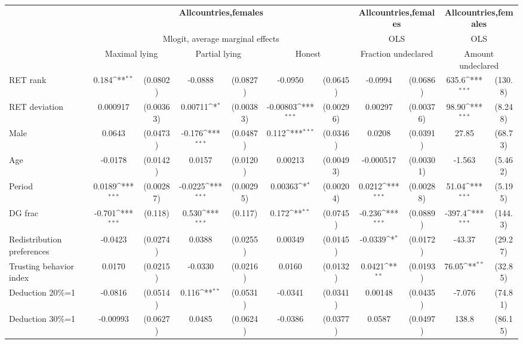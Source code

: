 \def\sym#1{\ifmmode^{#1}\else\(^{#1}\)\fi}
\begin{tabular}{l|cccccc|cc|cc}
\hline\hline
&\multicolumn{6}{c|}{\bf All\space{}countries,\space{}females}&\multicolumn{2}{c|}{\bf All\space{}countries,\space{}females}&\multicolumn{2}{c}{\bf All\space{}countries,\space{}females}\\ &\multicolumn{6}{c|}{Mlogit, average marginal effects }&\multicolumn{2}{c|}{OLS}&\multicolumn{2}{c}{OLS}\\
                &\multicolumn{2}{c}{Maximal lying}&\multicolumn{2}{c}{Partial lying}&\multicolumn{2}{c}{Honest}  &\multicolumn{2}{c}{Fraction undeclared}&\multicolumn{2}{c}{Amount undeclared}\\
\hline
RET rank        &    0.184\sym{**} & (0.0802)&  -0.0888         & (0.0827)&  -0.0950         & (0.0645)&  -0.0994         & (0.0686)&    635.6\sym{***}&  (130.8)\\
RET deviation   & 0.000917         &(0.00363)&  0.00711\sym{*}  &(0.00383)& -0.00803\sym{***}&(0.00296)&  0.00297         &(0.00376)&    98.90\sym{***}&  (8.248)\\
Male            &   0.0643         & (0.0473)&   -0.176\sym{***}& (0.0487)&    0.112\sym{***}& (0.0346)&   0.0208         & (0.0391)&    27.85         &  (68.73)\\
Age             &  -0.0178         & (0.0142)&   0.0157         & (0.0120)&  0.00213         &(0.00493)&-0.000517         &(0.00301)&   -1.563         &  (5.462)\\
Period          &   0.0189\sym{***}&(0.00287)&  -0.0225\sym{***}&(0.00295)&  0.00363\sym{*}  &(0.00204)&   0.0212\sym{***}&(0.00288)&    51.04\sym{***}&  (5.195)\\
DG frac         &   -0.701\sym{***}&  (0.118)&    0.530\sym{***}&  (0.117)&    0.172\sym{**} & (0.0745)&   -0.236\sym{***}& (0.0889)&   -397.4\sym{***}&  (144.3)\\
Redistribution preferences&  -0.0423         & (0.0274)&   0.0388         & (0.0255)&  0.00349         & (0.0145)&  -0.0339\sym{*}  & (0.0172)&   -43.37         &  (29.27)\\
Trusting behavior index&   0.0170         & (0.0215)&  -0.0330         & (0.0216)&   0.0160         & (0.0132)&   0.0421\sym{**} & (0.0193)&    76.05\sym{**} &  (32.85)\\
Deduction 20\%=1&  -0.0816         & (0.0514)&    0.116\sym{**} & (0.0531)&  -0.0341         & (0.0341)&  0.00148         & (0.0435)&   -7.076         &  (74.81)\\
Deduction 30\%=1& -0.00993         & (0.0627)&   0.0485         & (0.0624)&  -0.0386         & (0.0377)&   0.0587         & (0.0497)&    138.8         &  (86.15)\\

\end{tabular}
